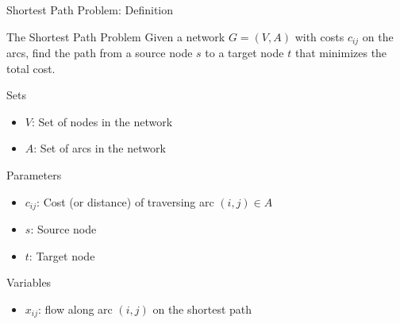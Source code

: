 \documentclass{beamer}
\begin{document}
\begin{frame}{Shortest Path Problem: Definition}
\begin{block}{The Shortest Path Problem}
Given a network $G = (V, A)$ with costs $c_{ij}$ on the arcs, find the path from a source node $s$ to a target node $t$ that minimizes the total cost.
\end{block}

\begin{block}{Sets}
\begin{itemize}
\item $V$: Set of nodes in the network
\item $A$: Set of arcs in the network
\end{itemize}
\end{block}

\begin{block}{Parameters}
\begin{itemize}
\item $c_{ij}$: Cost (or distance) of traversing arc $(i,j) \in A$
\item $s$: Source node
\item $t$: Target node
\end{itemize}
\end{block}

\begin{block}{Variables}
\begin{itemize}
\item $x_{ij}$: flow along arc $(i,j)$ on the shortest path
\end{itemize}
\end{block}
\end{frame}
\end{document}
